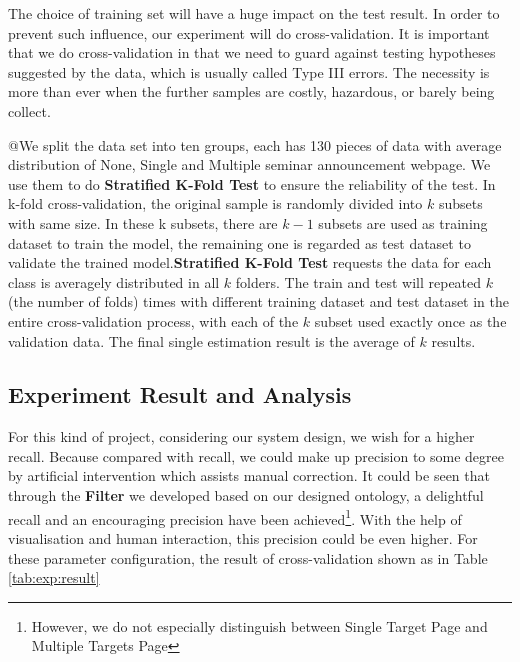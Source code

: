 The choice of training set will have a huge impact on the test result. In order to prevent such influence, our experiment will do cross-validation. It is important that we do cross-validation in that we need to guard against testing hypotheses suggested by the data, which is usually called Type III errors\cite{kohavi1995study}. The necessity is more than ever when the further samples are costly, hazardous, or barely being collect.

@We split the data set into ten groups, each has 130 pieces of data with average distribution of None, Single and Multiple seminar announcement webpage. We use them to do \textbf{Stratified K-Fold Test} to ensure the reliability of the test. In k-fold cross-validation, the original sample is randomly divided into $k$ subsets with same size. In these k subsets, there are $k-1$ subsets are used as training dataset to train the model, the remaining one is regarded as test dataset to validate the trained model.\textbf{Stratified K-Fold Test}\cite{refaeilzadeh2009cross} requests the data for each class is averagely distributed in all $k$ folders. The train and test will repeated $k$(the number of folds) times with different training dataset and test dataset in the entire cross-validation process, with each of the $k$ subset used exactly once as the validation data. The final single estimation result is the average of $k$ results\cite{mclachlan2005analyzing}.

\subsection{Experiment Result and Analysis}
For this kind of project, considering our system design, we wish for a higher recall. Because compared with recall, we could make up precision to some degree by artificial intervention which assists manual correction. It could be seen that through the \textbf{Filter} we developed based on our designed ontology, a delightful recall and an encouraging precision have been achieved\footnote{However, we do not especially distinguish between Single Target Page and Multiple Targets Page}. With the help of visualisation and human interaction, this precision could be even higher. For these parameter configuration, the result of cross-validation shown as in Table \ref{tab:exp:result}

